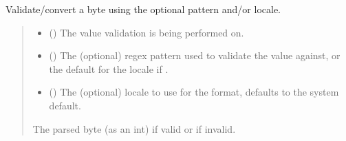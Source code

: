 \documentclass[letterpaper,10pt,english]{sphinxmanual}
\begin{document}
\begin{fulllineitems}
\begin{fulllineitems}
\begin{quote}
\begin{description}
\end{description}\end{quote}

\end{fulllineitems}


\begin{fulllineitems}
\label{\detokenize{apache_commons_validator_python.routines:apache_commons_validator_python.routines.byte_validator.ByteValidator.validate}}
\pysigstartsignatures
{}
\pysigstopsignatures
\sphinxAtStartPar
Validate/convert a byte using the optional pattern and/or locale.
\begin{quote}\begin{description}
\begin{itemize}
\item {} 
\sphinxAtStartPar
{} () \textendash{} The value validation is being performed on.

\item {} 
\sphinxAtStartPar
{} () \textendash{} The (optional) regex pattern used to validate the value against,
or the default for the locale if .

\item {} 
\sphinxAtStartPar
{} () \textendash{} The (optional) locale to use for the format, defaults to the system default.

\end{itemize}

\sphinxAtStartPar
The parsed byte (as an int) if valid or  if invalid.

\end{description}\end{quote}

\end{fulllineitems}


\end{fulllineitems}
\end{document}
